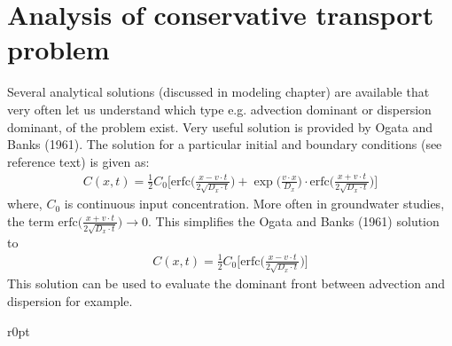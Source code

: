 \documentclass[letterpaper,10pt,english]{jupyterBook}
\begin{document}
\section{Analysis of conservative transport problem}
\label{\detokenize{content/transport/L9/21_conservative_transport:analysis-of-conservative-transport-problem}}
\sphinxAtStartPar
Several analytical solutions (discussed in modeling chapter) are available that very often let us understand which type \sphinxhyphen{} e.g. advection dominant or dispersion dominant, of the problem exist. Very useful solution is provided by Ogata and Banks (1961). The solution for a particular initial and boundary conditions (see reference text) is given as:
\begin{equation*}
\begin{split}
C(x, t) = \frac{1}{2}C_0 \Bigg[\text{erfc}\Bigg(\frac{x-v\cdot t}{2\sqrt{D_x \cdot t}}\Bigg)+ \exp\Bigg(\frac{v\cdot x}{D_x}\Bigg)\cdot \text{erfc}\Bigg(\frac{x+v\cdot t}{2\sqrt{D_x \cdot t}}\Bigg)\Bigg]
\end{split}
\end{equation*}
\sphinxAtStartPar
where, \(C_0\) is continuous input concentration. More often in groundwater studies, the term \(\text{erfc}\Big(\frac{x+v\cdot t}{2\sqrt{D_x \cdot t}}\Big)\to 0 \). This simplifies the Ogata and Banks (1961) solution to
\begin{equation*}
\begin{split}
C(x, t) = \frac{1}{2}C_0 \Bigg[\text{erfc}\Bigg(\frac{x-v\cdot t}{2\sqrt{D_x \cdot t}}\Bigg)\Bigg]
\end{split}
\end{equation*}
\sphinxAtStartPar
This solution can be used to evaluate the dominant front between advection and dispersion for example.

\begin{sphinxShadowBox}


\begin{wrapfigure}{r}{0pt}
\centering
\noindent{}
\label{\detokenize{content/transport/L9/21_conservative_transport:j-ad-dis}}\end{wrapfigure}
\end{sphinxShadowBox}
\end{document}
